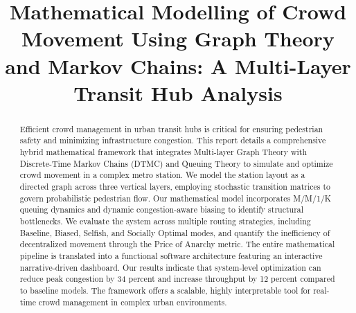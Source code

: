 \documentclass[conference]{IEEEtran}
\begin{document}
\title{Mathematical Modelling of Crowd Movement Using Graph Theory and Markov Chains: A Multi-Layer Transit Hub Analysis}

\author{
\and
{}
\and
{}
}

\maketitle

\begin{abstract}
Efficient crowd management in urban transit hubs is critical for ensuring pedestrian safety and minimizing infrastructure congestion. This report details a comprehensive hybrid mathematical framework that integrates Multi-layer Graph Theory with Discrete-Time Markov Chains (DTMC) and Queuing Theory to simulate and optimize crowd movement in a complex metro station. We model the station layout as a directed graph across three vertical layers, employing stochastic transition matrices to govern probabilistic pedestrian flow. Our mathematical model incorporates M/M/1/K queuing dynamics and dynamic congestion-aware biasing to identify structural bottlenecks. We evaluate the system across multiple routing strategies, including Baseline, Biased, Selfish, and Socially Optimal modes, and quantify the inefficiency of decentralized movement through the Price of Anarchy metric. The entire mathematical pipeline is translated into a functional software architecture featuring an interactive narrative-driven dashboard. Our results indicate that system-level optimization can reduce peak congestion by 34 percent and increase throughput by 12 percent compared to baseline models. The framework offers a scalable, highly interpretable tool for real-time crowd management in complex urban environments.
\end{abstract}
\end{document}
